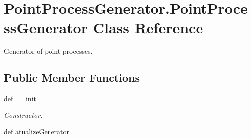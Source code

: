 \hypertarget{class_point_process_generator_1_1_point_process_generator}{\section{Point\-Process\-Generator.\-Point\-Process\-Generator Class Reference}
\label{class_point_process_generator_1_1_point_process_generator}
}


Generator of point processes.  


\subsection*{Public Member Functions}
\begin{DoxyCompactItemize}
\item 
def \hyperlink{class_point_process_generator_1_1_point_process_generator_af40e8d97d489b9ef5ce0446ea327ce93}{\-\_\-\-\_\-init\-\_\-\-\_\-}
\begin{DoxyCompactList}\small\item\em Constructor. \end{DoxyCompactList}\item 
def \hyperlink{class_point_process_generator_1_1_point_process_generator_a9e80adf5fea28ec4adb90489f0c42670}{atualize\-Generator}
\end{DoxyCompactItemize}
